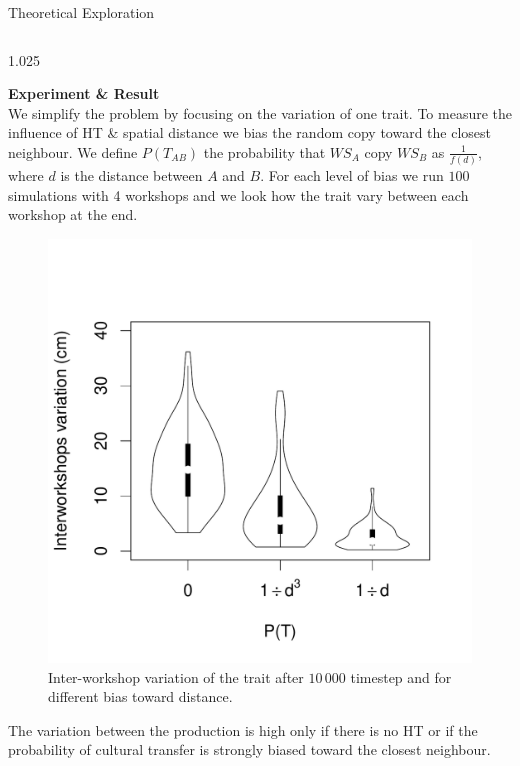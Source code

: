 \documentclass[final]{beamer}
\newlength{\onecolwid}
\newlength{\twocolwid}
\begin{document}
\begin{frame}[t]
\begin{columns}[t]
\begin{column}{\twocolwid}
\begin{block}{Theoretical Exploration}
\begin{columns}[t,totalwidth=\twocolwid]
\begin{column}{1.025\onecolwid} %
\justify

{\textbf{Experiment \& Result}}\\
We simplify the problem by focusing on the variation of one trait. To measure the influence of HT \& spatial distance we bias the random copy toward the closest neighbour. We define $P(T_{AB})$ the probability that $WS_A$ copy $WS_B$ as $\frac{1}{f(d)}$, where $d$ is the distance between $A$ and $B$.
For each level of bias we run $100$ simulations with 4 workshops and we look how the trait vary between each workshop at the end.
\vspace{-.7cm}

    \begin{figure}[h!]
    \centering
%	    
	\includegraphics[width=0.5\linewidth]{images/interworkshopvar.pdf}
\singlespace
\vspace{-.8cm}
\caption{Inter-workshop variation of the trait after $10\,000$ timestep and for different bias toward distance.}%
	
	\label{fig:resmod}
    \end{figure}
\vspace{-1cm}



The variation between the production is high only if there is no HT or if the probability of cultural transfer is strongly biased toward the closest neighbour.


\end{column}
\end{columns}
\end{block}
\end{column}
\end{columns}
\end{frame}
\end{document}
